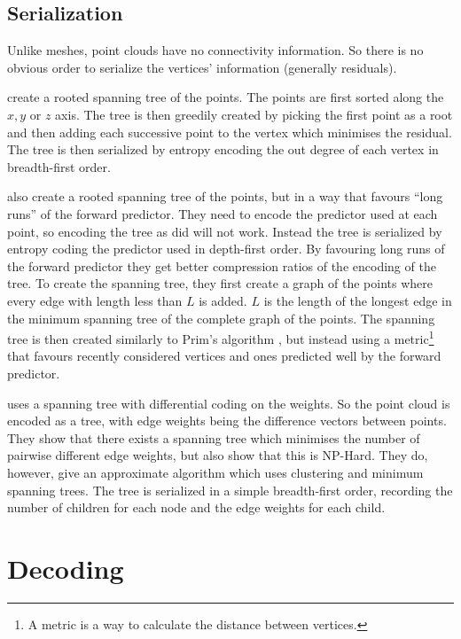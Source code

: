 \documentclass{report}
\begin{document}
\subsection{Serialization}
\label{sec:serialization}

Unlike meshes, point clouds have no connectivity information. So there is no
obvious order to serialize the vertices' information (generally residuals).

\citet{gumholdcomp} create a rooted spanning tree of the points. The points
are first sorted along the $x, y$ or $z$ axis. The tree is then greedily
created by picking the first point as a root and then adding each successive
point to the vertex which minimises the residual. The tree is then serialized
by entropy encoding the out degree of each vertex in breadth-first order.

\citet{merrycomp} also create a rooted spanning tree of the points, but in a
way that favours ``long runs'' of the forward predictor. They need to encode
the predictor used at each point, so encoding the tree as \citet{gumholdcomp}
did will not work. Instead the tree is serialized by entropy coding the
predictor used in depth-first order. By favouring long runs of the forward
predictor they get better compression ratios of the encoding of the tree. To
create the spanning tree, they first create a graph of the points where every
edge with length less than $L$ is added. $L$ is the length of the longest edge
in the minimum spanning tree of the complete graph of the points. The spanning
tree is then created similarly to Prim's algorithm \citep[p.\ 457]{sedgewick},
but instead using a metric\footnote{A metric is a way to calculate the
  distance between vertices.} that favours recently considered vertices and
ones predicted well by the forward predictor.

\citet{chen2005lcp} uses a spanning tree with differential coding on the
weights. So the point cloud is encoded as a tree, with edge weights being the
difference vectors between points. They show that there exists a spanning tree
which minimises the number of pairwise different edge weights, but also show
that this is NP-Hard. They do, however, give an approximate algorithm which
uses clustering and minimum spanning trees. The tree is serialized in a simple
breadth-first order, recording the number of children for each node and the
edge weights for each child.


\section{Decoding}
\end{document}
